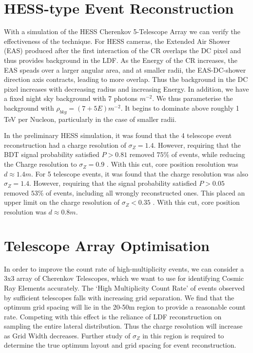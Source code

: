 \documentclass{article}
\begin{document}
\section{HESS-type Event Reconstruction}
With a simulation of the HESS Cherenkov 5-Telescope Array we can verify the effectiveness of the technique. For HESS cameras, the Extended Air Shower (EAS) produced after the first interaction of the CR overlaps the DC pixel and thus provides background in the LDF. As the Energy of the CR increases, the EAS speads over a larger angular area, and at smaller radii, the EAS-DC-shower direction axis contracts, leading to more overlap. Thus the background in the DC pixel increases with decreasing radius and increasing Energy. In addition, we have a fixed night sky background with 7 photons $m^{-2}$. We thus parameterise the background with $ \rho_{bkg}  = (7 + 5E) m^{-2}$. It begins to dominate above roughly 1 TeV per Nucleon, particularly in the case of smaller radii.

In the preliminary HESS simulation, it was found that the 4 telescope event reconstruction had a charge resolution of $\sigma_{Z} = 1.4$. However, requiring that the BDT signal probability satisfied $P > 0.81$ removed $75 \%$ of events, while reducing the Charge resolution to $\sigma_{Z} = 0.9$ . With this cut, core position resolution was $d \approx 1.4 m $. For 5 telescope events, it was found that the charge resolution was also $\sigma_{Z} = 1.4$. However, requiring that the signal probability satisfied $P > 0.05$ removed $53 \%$ of events, including all wrongly reconstructed ones. This placed an upper limit on the charge resolution of $\sigma_{Z} < 0.35$ . With this cut, core position resolution was $d \approx 0.8 m $.

\section{Telescope Array Optimisation}
In order to improve the count rate of high-multiplicity events, we can consider a 3x3 array of Cherenkov Telescopes, which we want to use for identifying Cosmic Ray Elements accurately. The \textquoteleft High Multiplicity Count Rate' of events observed by sufficient telescopes falls with increasing grid separation. We find that the optimum grid spacing will lie in the 20-50m region to provide a reasonable count rate. Competing with this effect is the reliance of LDF reconstruction on sampling the entire lateral distribution. Thus the charge resolution will increase as Grid Width decreases. Further study of $\sigma_{Z}$ in this region is required to determine the true optimum layout and grid spacing for event reconstruction. 
\end{document}
